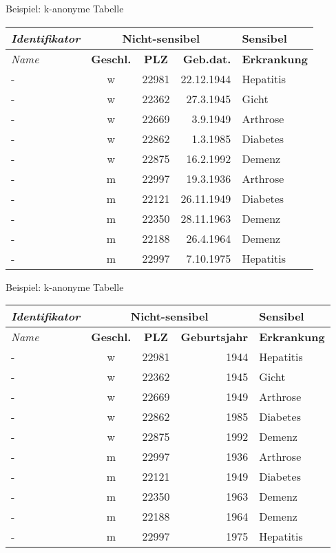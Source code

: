 \begin{frame}{Beispiel: k-anonyme Tabelle}
	\begin{center}
		\begin{tabular}{|l|c|c|r|l|}
		\hline \textit{Identifikator} & \multicolumn{3}{c|}{\textbf{Nicht-sensibel}} & \textbf{Sensibel} \\ 
		\hline \textit{Name} & \textbf{Geschl.} & \textbf{PLZ} & \textbf{Geb.dat.} & \textbf{Erkrankung} \\
		\hline \hline - & w & 22981 & 22.12.1944 & Hepatitis \\ 
		\hline - & w & 22362 & 27.3.1945 & Gicht \\
		\hline - & w & 22669 & 3.9.1949 & Arthrose \\ 
		\hline - & w & 22862 & 1.3.1985 & Diabetes \\ 
		\hline - & w & 22875 & 16.2.1992 & Demenz \\  
		\hline - & m & 22997 & 19.3.1936 & Arthrose \\ 
		\hline - & m & 22121 & 26.11.1949 & Diabetes \\ 
		\hline - & m & 22350 & 28.11.1963 & Demenz \\ 
		\hline - & m & 22188 & 26.4.1964 & Demenz \\ 
		\hline - & m & 22997 & 7.10.1975 & Hepatitis \\ 
		\hline 
		\end{tabular}
	\end{center}
\end{frame}

\begin{frame}{Beispiel: k-anonyme Tabelle}
	\begin{center}
		\begin{tabular}{|l|c|c|r|l|}
		\hline \textit{Identifikator} & \multicolumn{3}{c|}{\textbf{Nicht-sensibel}} & \textbf{Sensibel} \\ 
		\hline \textit{Name} & \textbf{Geschl.} & \textbf{PLZ} & \textbf{Geburtsjahr} & \textbf{Erkrankung} \\ \hline
		\hline - & w & 22981 & 1944 & Hepatitis \\ 
		\hline - & w & 22362 & 1945 & Gicht \\
		\hline - & w & 22669 & 1949 & Arthrose \\ 
		\hline - & w & 22862 & 1985 & Diabetes \\ 
		\hline - & w & 22875 & 1992 & Demenz \\  
		\hline - & m & 22997 & 1936 & Arthrose \\ 
		\hline - & m & 22121 & 1949 & Diabetes \\ 
		\hline - & m & 22350 & 1963 & Demenz \\ 
		\hline - & m & 22188 & 1964 & Demenz \\ 
		\hline - & m & 22997 & 1975 & Hepatitis \\ 
		\hline 
		\end{tabular}
	\end{center}
\end{frame}

